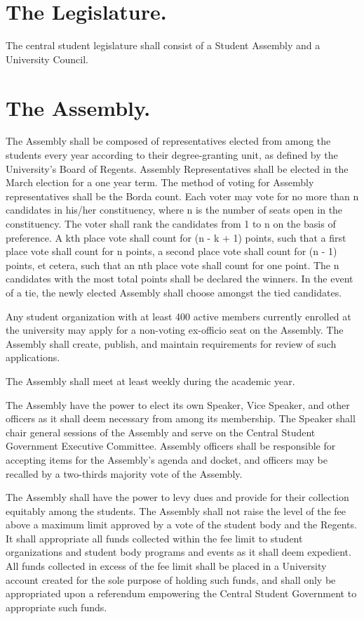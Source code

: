 \section{The Legislature.}
    The central student legislature shall consist of a Student Assembly and a University Council.


\section{The Assembly.}
    The Assembly shall be composed of representatives elected from among the students every year according to their degree-granting unit, as defined by the University's Board of Regents. Assembly Representatives shall be elected in the March election for a one year term.  The method of voting for Assembly representatives shall be the Borda count. Each voter may vote for no more than n candidates in his/her constituency, where n is the number of seats open in the constituency. The voter shall rank the candidates from 1 to n on the basis of preference.  A kth place vote shall count for (n - k + 1) points, such that a first place vote shall count for n points, a second place vote shall count for (n - 1) points, et cetera, such that an nth place vote shall count for one point.  The n candidates with the most total points shall be declared the winners.  In the event of a tie, the newly elected Assembly shall choose amongst the tied candidates.

    Any student organization with at least 400 active members currently enrolled at the university may apply for a non-voting ex-officio seat on the Assembly. The Assembly shall create, publish, and maintain requirements for review of such applications.

    The Assembly shall meet at least weekly during the academic year.

    The Assembly have the power to elect its own Speaker, Vice Speaker, and other officers as it shall deem necessary from among its membership. The Speaker shall chair general sessions of the Assembly and serve on the Central Student Government Executive Committee. Assembly officers shall be responsible for accepting items for the Assembly's agenda and docket, and officers may be recalled by a two-thirds majority vote of the Assembly.

     The Assembly shall have the power to levy dues and provide for their collection equitably among the students. The Assembly shall not raise the level of the fee above a maximum limit approved by a vote of the student body and the Regents. It shall appropriate all funds collected within the fee limit to student organizations and student body programs and events as it shall deem expedient. All funds collected in excess of the fee limit shall be placed in a University account created for the sole purpose of holding such funds, and shall only be appropriated upon a referendum empowering the Central Student Government to appropriate such funds. 

